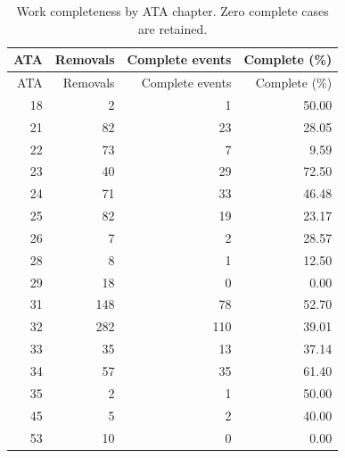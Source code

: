 \begin{small}

\setlength{\tabcolsep}{4pt}

\begin{longtable}{rrrr}

\caption{Work completeness by ATA chapter. Zero complete cases are retained.}\label{tab:s-selection}\\

\toprule

ATA & Removals & Complete events & Complete (\%) \\

\midrule

\endfirsthead

\toprule

ATA & Removals & Complete events & Complete (\%) \\

\midrule

\endhead

18 & 2 & 1 & 50.00 \\

21 & 82 & 23 & 28.05 \\

22 & 73 & 7 & 9.59 \\

23 & 40 & 29 & 72.50 \\

24 & 71 & 33 & 46.48 \\

25 & 82 & 19 & 23.17 \\

26 & 7 & 2 & 28.57 \\

28 & 8 & 1 & 12.50 \\

29 & 18 & 0 & 0.00 \\

31 & 148 & 78 & 52.70 \\

32 & 282 & 110 & 39.01 \\

33 & 35 & 13 & 37.14 \\

34 & 57 & 35 & 61.40 \\

35 & 2 & 1 & 50.00 \\

45 & 5 & 2 & 40.00 \\

53 & 10 & 0 & 0.00 \\


\end{longtable}
\end{small}
